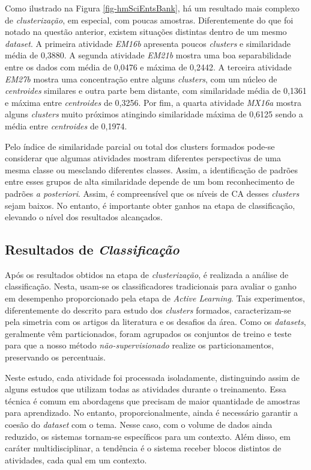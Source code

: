 Como ilustrado na Figura \ref{fig-hmSciEntsBank}, há um resultado mais complexo de \textit{clusterização}, em especial, com poucas amostras. Diferentemente do que foi notado na questão anterior, existem situações distintas dentro de um mesmo \textit{dataset}. A primeira atividade \textit{EM16b} apresenta poucos \textit{clusters} e similaridade média de 0,3880. A segunda atividade \textit{EM21b} mostra uma boa separabilidade entre os dados com média de 0,0476 e máxima de 0,2442. A terceira atividade \textit{EM27b} mostra uma concentração entre alguns \textit{clusters}, com um núcleo de \textit{centroides} similares e outra parte bem distante, com similaridade média de 0,1361 e máxima entre \textit{centroides} de 0,3256. Por fim, a quarta atividade \textit{MX16a} mostra alguns \textit{clusters} muito próximos atingindo similaridade máxima de 0,6125 sendo a média entre \textit{centroides} de 0,1974.

Pelo índice de similaridade parcial ou total dos clusters formados pode-se considerar que algumas atividades mostram diferentes perspectivas de uma mesma classe ou mesclando diferentes classes. Assim, a identificação de padrões entre esses grupos de alta similaridade depende de um bom reconhecimento de padrões \textit{a posteriori}. Assim, é compreensível que os níveis de CA desses \textit{clusters} sejam baixos. No entanto, é importante obter ganhos na etapa de classificação, elevando o nível dos resultados alcançados.

\subsection{Resultados de \textit{Classificação}}
\label{sec-res-classificacao}

Após os resultados obtidos na etapa de \textit{clusterização}, é realizada a análise de classificação. Nesta, usam-se os classificadores tradicionais para avaliar o ganho em desempenho proporcionado pela etapa de \textit{Active Learning}. Tais experimentos, diferentemente do descrito para estudo dos \textit{clusters} formados, caracterizam-se pela simetria com  os artigos da literatura e os desafios da área. Como os \textit{datasets}, geralmente vêm particionados, foram agrupados os conjuntos de treino e teste para que a nosso método \textit{não-supervisionado} realize os particionamentos, preservando os percentuais.

Neste estudo, cada atividade foi processada isoladamente, distinguindo assim de alguns estudos que utilizam todas as atividades durante o treinamento. Essa técnica é comum em abordagens que precisam de maior quantidade de amostras para aprendizado. No entanto, proporcionalmente, ainda é necessário garantir a coesão do \textit{dataset} com o tema. Nesse caso, com o volume de dados ainda reduzido, os sistemas tornam-se específicos para um contexto. Além disso, em caráter multidisciplinar, a tendência é o sistema receber blocos distintos de atividades, cada qual em um contexto.

